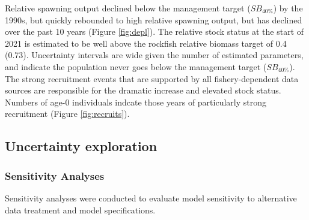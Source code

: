 \documentclass[11pt,
  english,
  a4paper,
]{article}
\begin{document}
\leavevmode\tagmcend\tagstructend\par


Relative spawning output declined below the management target ({\(SB_{40\%}\)\leavevmode\tagmcend\tagstructend}) by the 1990s, but quickly rebounded to high relative spawning output, but has declined over the past 10 years (Figure \ref{fig:depl}). The relative stock status at the start of 2021 is estimated to be well above the rockfish relative biomass target of 0.4 (0.73). Uncertainty intervals are wide given the number of estimated parameters, and indicate the population never goes below the management target ({\(SB_{40\%}\)\leavevmode\tagmcend\tagstructend}). The strong recruitment events that are supported by all fishery-dependent data sources are responsible for the dramatic increase and elevated stock status. Numbers of age-0 individuals indcate those years of particularly strong recruitment (Figure \ref{fig:recruits}).

\leavevmode\tagmcend\tagstructend\par


\hypertarget{uncertainty-exploration}{%
\subsection{Uncertainty exploration}\label{uncertainty-exploration}}

\leavevmode\tagmcend\tagstructend


\hypertarget{sensitivity-analyses}{%
\subsubsection{Sensitivity Analyses}\label{sensitivity-analyses}}

\leavevmode\tagmcend\tagstructend


Sensitivity analyses were conducted to evaluate model sensitivity to alternative data treatment and model specifications.

\leavevmode\tagmcend\tagstructend\par

\end{document}
